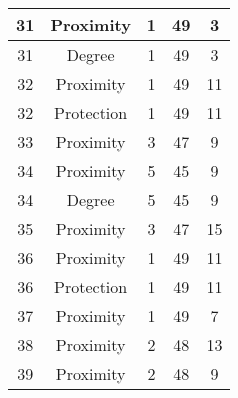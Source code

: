 \documentclass[results.tex]{subfiles}
\begin{document}
\begin{center}
\begin{tabular}{| c || c | c | c | c |}
            \hline
            31                      & Proximity                    & 1                      & 49                      & 3                    \\
            \hline
            31                      & Degree                       & 1                      & 49                      & 3                    \\
            \hline
            32                      & Proximity                    & 1                      & 49                      & 11                   \\
            \hline
            32                      & Protection                   & 1                      & 49                      & 11                   \\
            \hline
            33                      & Proximity                    & 3                      & 47                      & 9                    \\
            \hline
            34                      & Proximity                    & 5                      & 45                      & 9                    \\
            \hline
            34                      & Degree                       & 5                      & 45                      & 9                    \\
            \hline
            35                      & Proximity                    & 3                      & 47                      & 15                   \\
            \hline
            36                      & Proximity                    & 1                      & 49                      & 11                   \\
            \hline
            36                      & Protection                   & 1                      & 49                      & 11                   \\
            \hline
            37                      & Proximity                    & 1                      & 49                      & 7                    \\
            \hline
            38                      & Proximity                    & 2                      & 48                      & 13                   \\
            \hline
            39                      & Proximity                    & 2                      & 48                      & 9                    \\

\end{tabular}
\end{center}
\end{document}
